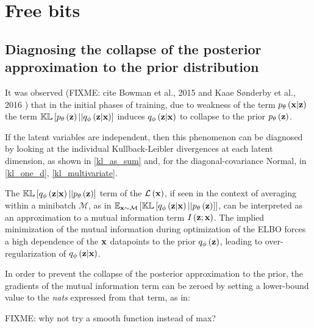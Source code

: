 \section{Free bits}

\subsection{Diagnosing the collapse of the posterior approximation to the prior distribution}

It was observed\cite{Kingma2017}\cite{1611.02731} (FIXME: cite Bowman et al., 2015 and Kaae Sønderby et al., 2016 )
that in the initial phases of training, due to weakness of the term $p_\theta\left(\mathbf{x}|\mathbf{z}\right)$ the term $\mathbb{KL}\left[ p_\theta\left(\mathbf{z}\right) || q_\phi\left(\mathbf{z}|\mathbf{x}\right) \right]$ 
induces $q_\phi\left(\mathbf{z}|\mathbf{x}\right)$ to collapse to the prior $p_\theta\left(\mathbf{z}\right)$.

If the latent variables are independent, then this phenomenon can be diagnosed by looking at the individual Kullback-Leibler divergences
at each latent dimension, as shown in \ref{kl_as_sum} and, for the diagonal-covariance Normal, in \ref{kl_one_d}, \ref{kl_multivariate}.

 The $\mathbb{KL}\left[ q_\phi\left(\mathbf{z}|\mathbf{x}\right) || p_\theta\left(\mathbf{z}\right) \right]$ term of the $\mathcal{L}\left(\mathbf{x}\right)$, if seen in the context of averaging within a minibatch $\mathcal{M}$, as in
 $\mathbb{E}_{\mathbf{x}\sim\mathcal{M}}\left[ \mathbb{KL}\left[ q_\phi\left(\mathbf{z}|\mathbf{x}\right) || p_\theta\left(\mathbf{z}\right) \right] \right]$,
 can be interpreted as an approximation to a mutual information term $I\left( \mathbf{z} ; \mathbf{x} \right)$.
 The implied minimization of the mutual information during optimization of the ELBO forces a high dependence of the $\mathbf{x}$ datapoints to the prior $q_\phi\left(\mathbf{z}\right)$,
 leading to over-regularization of $q_\phi\left(\mathbf{z}|\mathbf{x}\right)$.

 In order to prevent the collapse of the posterior approximation to the prior, the gradients of the mutual information term can be zeroed by setting a lower-bound
 value to the \emph{nats} expressed from that term, as in:
\begin{nalign}
     \max\left[\lambda,\expectxM{\kl{\qzcond}{\pzonly}}\right]
\end{nalign}

FIXME: why not try a smooth function instead of max?
